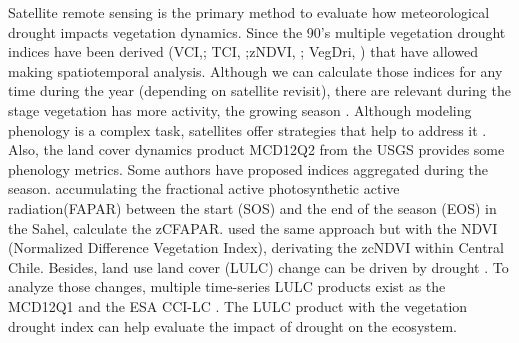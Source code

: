 \documentclass[preprint,
3p]{elsarticle} %
\begin{document}
Satellite remote sensing \citep{West2019, AghaKouchak2015} is the
primary method to evaluate how meteorological drought impacts vegetation
dynamics. Since the 90's multiple vegetation drought indices have been
derived (VCI,\citep{Kogan1990}; TCI, \citep{Kogan1995};zNDVI,
\citep{Peters2002}; VegDri, \citep{Brown2008}) that have allowed making
spatiotemporal analysis. Although we can calculate those indices for any
time during the year (depending on satellite revisit), there are
relevant during the stage vegetation has more activity, the growing
season \citep{Mishra2015}. Although modeling phenology is a complex
task, satellites offer strategies that help to address it
\citep{Younes2021, Vrieling2018, Cai2017}. Also, the land cover dynamics
product MCD12Q2 from the USGS \citep{Friedl2019} provides some phenology
metrics. Some authors have proposed indices aggregated during the
season. \citet{Meroni2017} accumulating the fractional active
photosynthetic active radiation(FAPAR) between the start (SOS) and the
end of the season (EOS) in the Sahel, calculate the zCFAPAR.
\citet{Zambrano2018} used the same approach but with the NDVI
(Normalized Difference Vegetation Index), derivating the zcNDVI within
Central Chile. Besides, land use land cover (LULC) change can be driven
by drought \citep{Tran2019, Akinyemi2021}. To analyze those changes,
multiple time-series LULC products exist as the MCD12Q1
\citep{Friedl2019} and the ESA CCI-LC \citep{ESA2017}. The LULC product
with the vegetation drought index can help evaluate the impact of
drought on the ecosystem.
\end{document}
